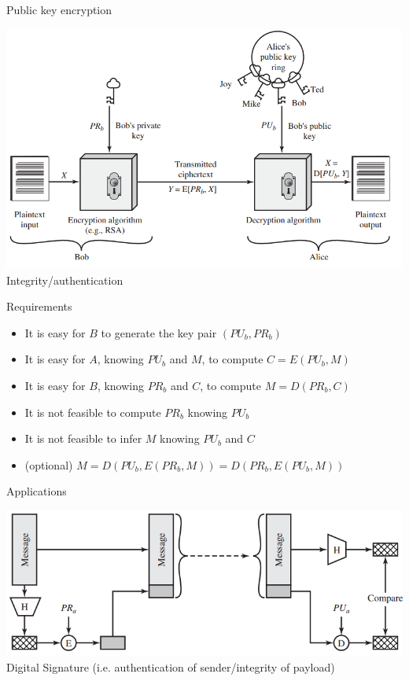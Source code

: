 \documentclass{beamer}
\begin{document}
\begin{frame}{Public key encryption}
  \begin{center}
    \includegraphics[width=0.8\linewidth]{public2}\\
  Integrity/authentication
  \end{center}
\end{frame}


\begin{frame}{Requirements}
  \begin{itemize}
    \item It is easy for $B$ to generate the key pair $(PU_b,PR_b)$
    \item It is easy for $A$, knowing $PU_b$ and $M$, to compute $C=E(PU_b, M)$ 
    \item It is easy for $B$, knowing $PR_b$ and $C$, to compute $M=D(PR_b, C)$ 
    \item It is not feasible to compute $PR_b$ knowing $PU_b$ 
    \item It is not feasible to infer $M$ knowing $PU_b$ and $C$
    \item (optional) $M=D(PU_b,E(PR_b,M))=D(PR_b,E(PU_b,M))$
  \end{itemize}
\end{frame}
 

\begin{frame}{Applications}
  \begin{center}
    \includegraphics[width=0.8\linewidth]{signature}\\
  Digital Signature (i.e. authentication of sender/integrity of payload)
  \end{center}
\end{frame}
 
\end{document}
